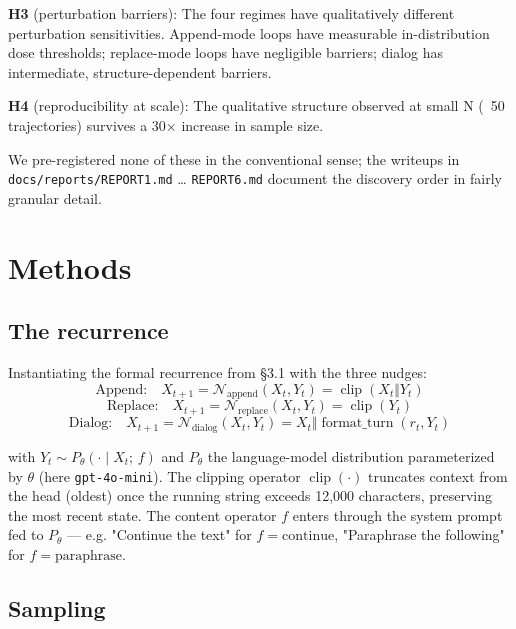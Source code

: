 \documentclass{article}
\theoremstyle{plain}
\theoremstyle{definition}
\begin{document}
\textbf{H3} (perturbation barriers): The four regimes have qualitatively
different perturbation sensitivities. Append-mode loops have measurable
in-distribution dose thresholds; replace-mode loops have negligible
barriers; dialog has intermediate, structure-dependent barriers.

\textbf{H4} (reproducibility at scale): The qualitative structure observed at
small N (~50 trajectories) survives a 30× increase in sample size.

We pre-registered none of these in the conventional sense; the writeups
in \texttt{docs/reports/REPORT1.md} … \texttt{REPORT6.md} document the discovery order
in fairly granular detail.


\section{Methods}

\subsection{The recurrence}

Instantiating the formal recurrence from §3.1 with the three nudges:
\begin{equation*}
\text{Append:}\quad   X_{t+1} = \mathcal{N}_{\text{append}}(X_t, Y_t)  = \operatorname{clip}(X_t \Vert Y_t)
\end{equation*}
\begin{equation*}
\text{Replace:}\quad  X_{t+1} = \mathcal{N}_{\text{replace}}(X_t, Y_t) = \operatorname{clip}(Y_t)
\end{equation*}
\begin{equation*}
\text{Dialog:}\quad   X_{t+1} = \mathcal{N}_{\text{dialog}}(X_t, Y_t)  = X_t \Vert \operatorname{format\_turn}(r_t, Y_t)
\end{equation*}

with $Y_t \sim P_\theta(\cdot \mid X_t;\, f)$ and $P_\theta$ the
language-model distribution parameterized by $\theta$ (here
\texttt{gpt-4o-mini}). The clipping operator $\operatorname{clip}(\cdot)$
truncates context from the head (oldest) once the running string
exceeds 12,000 characters, preserving the most recent state. The
content operator $f$ enters through the system prompt fed to
$P_\theta$ — e.g. "Continue the text" for $f = \text{continue}$,
"Paraphrase the following" for $f = \text{paraphrase}$.

\subsection{Sampling}
\end{document}
